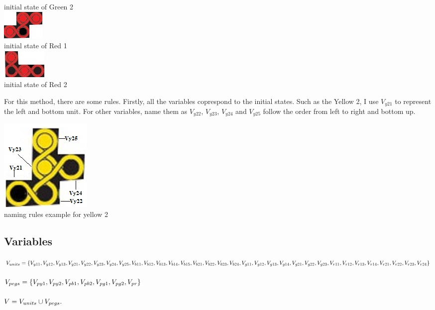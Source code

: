 \begin{center}
\\initial state of Green 2
\\\includegraphics{red1.jpg}
\\initial state of Red 1 
\\\includegraphics{red2.jpg}
\\initial state of Red 2 
\end{center}
For this method, there are some rules. Firstly, all the variables coprespond to the initial states. Such as the Yellow 2, I use $V_{y21}$ to represent the left and bottom unit. For other variables, name them as $V_{y22}$, $V_{y23}$, $V_{y24}$ and $V_{y25}$ follow the order from left to right and bottom up.
\begin{center}
\includegraphics{example.jpg}
\\naming rules example for yellow 2
\end{center}
\subsection{Variables}

$V_{units}=\{ V_{y11},V_{y12},
V_{y13},V_{y21},V_{y22},V_{y23},V_{y24},V_{y25},\\V_{b11},V_{b12},V_{b13},V_{b14},
V_{b15},V_{b21},V_{b22},V_{b23},\\V_{b24},V_{g11},V_{g12},V_{g13},V_{g14},V_{g21},V_{g22},V_{g23},\\V_{r11},
V_{r12},V_{r13},V_{r14},V_{r21},V_{r22},V_{r23},V_{r24}\}$\\
\\$V_{pegs} = \{V_{py1}, V_{py2}, V_{pb1}, V_{pb2}, V_{pg1}, V_{pg2}, V_{pr}\}$\\
\\$V = V_{units} \cup V_{pegs}.$
